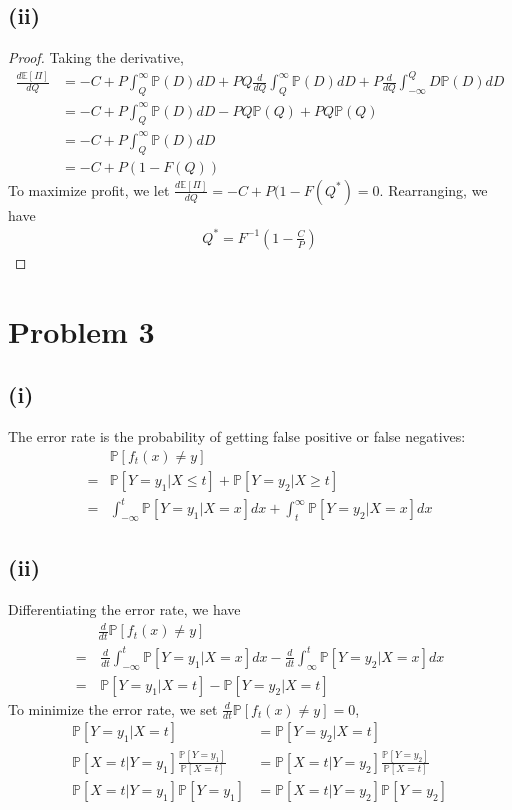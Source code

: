 \documentclass[twoside,11pt]{homework}
\begin{document}
\subsection*{(ii)}
	\begin{proof}
	Taking the derivative,
	\begin{align*}
		\frac{d\mathbb{E} [\Pi]}{dQ} &= -C + P\int_Q^\infty \mathbb{P}(D)dD
		+ PQ \frac{d}{dQ} \int_Q^\infty \mathbb{P}(D)dD
		+ P \frac{d}{dQ}  \int_{-\infty}^Q D\mathbb{P}(D)dD \\
		&= -C + P\int_Q^\infty \mathbb{P}(D)dD
		- PQ \mathbb{P}(Q)
		+ P Q\mathbb{P}(Q) \tag{Fundamental Theorem of Calculus}\\
		&=-C+P\int_Q^\infty \mathbb{P}(D)dD\\
		&=-C +P(1-F(Q))
	\end{align*}
	To maximize profit, we let $\frac{d\mathbb{E} [\Pi]}{dQ} =-C +P(1-F(Q^*)= 0$. Rearranging, we have
	\begin{align*}
		Q^*= F^{-1}\left(1-\frac{C}{P}\right)
	\end{align*}
	\end{proof}

\section*{Problem 3} 
\subsection*{(i)}
	The error rate is the probability of getting false positive or false negatives:
	\begin{align*}
		& \mathbb{P}[f_t(x)\neq y] \\
		=& \mathbb{P}[Y=y_1 | X\leq t] + \mathbb{P}[Y=y_2 | X\geq t] \\
		=& \int_{-\infty}^t  \mathbb{P}[Y=y_1 | X=x] dx + \int_{t}^\infty  \mathbb{P}[Y=y_2 | X=x] dx
	\end{align*}
\subsection*{(ii)}
	Differentiating the error rate, we have
	\begin{align*}
		& \frac{d}{dt} \mathbb{P}[f_t(x)\neq y]  \\
		=& \, \frac{d}{dt}\int_{-\infty}^t  \mathbb{P}[Y=y_1 | X=x] dx - \frac{d}{dt} \int_{\infty}^t  \mathbb{P}[Y=y_2 | X=x] dx \\
		=&\,  \mathbb{P}[Y=y_1 | X=t] - \mathbb{P}[Y=y_2 | X=t] \tag{Foundamental Theorem of Calculus}
	\end{align*}
	To minimize the error rate, we set $\frac{d}{dt} \mathbb{P}[f_t(x)\neq y] = 0$,
	\begin{align*}
		\mathbb{P}[Y=y_1 | X=t] &= \mathbb{P}[Y=y_2 | X=t] \\
		\mathbb{P}[ X=t | Y=y_1 ] \frac{ \mathbb{P}[ Y=y_1 ]}{ \mathbb{P}[ X=t]}
		&= \mathbb{P}[ X=t | Y=y_2 ] \frac{ \mathbb{P}[ Y=y_2 ]}{ \mathbb{P}[ X=t]} \tag{Bayes Rule}\\
		\mathbb{P}[ X=t | Y=y_1 ] \mathbb{P}[ Y=y_1 ] 
		&= \mathbb{P}[ X=t | Y=y_2 ] \mathbb{P}[ Y=y_2 ]
	\end{align*}
\end{document}

